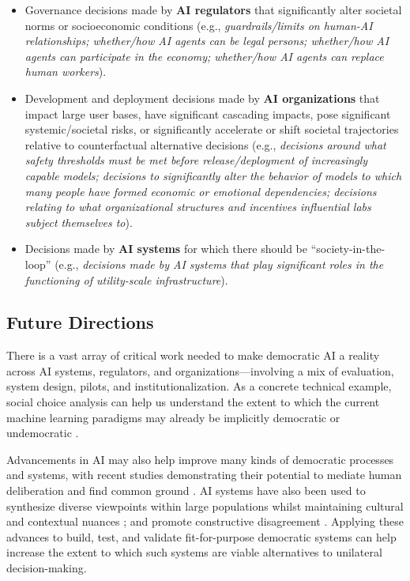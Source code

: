 \documentclass{article}
\begin{document}
    \begin{itemize} %

        \item Governance decisions made by \textbf{AI regulators} that significantly alter societal norms or socioeconomic conditions (e.g., \textit{guardrails/limits on human-AI relationships; whether/how AI agents can be legal persons; whether/how AI agents can participate in the economy; whether/how AI agents can replace human workers}).

        \item Development and deployment decisions made by \textbf{AI organizations} that impact large user bases, have significant cascading impacts, pose significant systemic/societal risks, or significantly accelerate or shift societal trajectories relative to counterfactual alternative decisions (e.g., \textit{decisions around what safety thresholds must be met before release/deployment of increasingly capable models; decisions to significantly alter the behavior of models to which many people have formed economic or emotional dependencies; decisions relating to what organizational structures and incentives influential labs subject themselves to}).

        \item Decisions made by \textbf{AI systems} for which there should be ``society-in-the-loop'' \cite{rahwan2018,konya2023} (e.g., \textit{decisions made by AI systems that play significant roles in the functioning of utility-scale infrastructure}).

    \end{itemize}

  \subsection{Future Directions}

    There is a vast array of critical work needed to make democratic AI a reality across AI systems, regulators, and organizations---involving a mix of evaluation, system design, pilots, and institutionalization. As a concrete technical example, social choice analysis can help us understand the extent to which the current machine learning paradigms may already be implicitly democratic or undemocratic \cite{conitzer2024social}.


    Advancements in AI may also help improve many kinds of democratic processes and systems, with recent studies demonstrating their potential to mediate human deliberation and find common ground \citep{bakker2022fine,fish2023generative,summerfield2024will,tessler2024ai,konya2023,goldberg2024}. AI systems have also been used to synthesize diverse viewpoints within large populations whilst maintaining cultural and contextual nuances \cite{leibo2024theory,bergman2024}; and promote constructive disagreement \cite{summerfield2024will,burton2024large}. Applying these advances to build, test, and validate fit-for-purpose democratic systems can help increase the extent to which such systems are viable alternatives to unilateral decision-making. 
\end{document}
